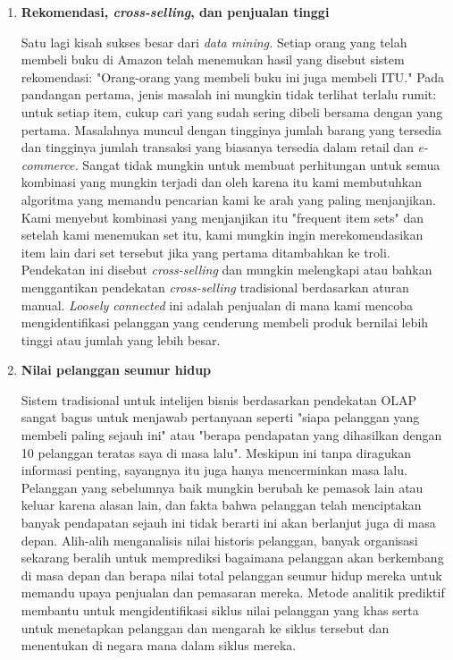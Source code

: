 \begin{enumerate}
    
  
 
  
  \item \textbf{Rekomendasi, \textit{cross-selling}, dan penjualan tinggi}
    \par Satu lagi kisah sukses besar dari \textit{data mining.} Setiap orang yang telah membeli buku di Amazon telah menemukan hasil yang disebut sistem rekomendasi: "Orang-orang yang membeli buku ini juga membeli ITU." Pada pandangan pertama, jenis masalah ini mungkin tidak terlihat terlalu rumit: untuk setiap item, cukup cari yang sudah sering dibeli bersama dengan yang pertama. Masalahnya muncul dengan tingginya jumlah barang yang tersedia dan tingginya jumlah transaksi yang biasanya tersedia dalam retail dan \textit{e-commerce. }Sangat tidak mungkin untuk membuat perhitungan untuk semua kombinasi yang mungkin terjadi dan oleh karena itu kami membutuhkan algoritma yang memandu pencarian kami ke arah yang paling menjanjikan. Kami menyebut kombinasi yang menjanjikan itu "frequent item sets" dan setelah kami menemukan set itu, kami mungkin ingin merekomendasikan item lain dari set tersebut jika yang pertama ditambahkan ke troli. Pendekatan ini disebut\textit{ cross-selling} dan mungkin melengkapi atau bahkan menggantikan pendekatan\textit{ cross-selling} tradisional berdasarkan aturan manual. \textit{Loosely connected }ini adalah penjualan di mana kami mencoba mengidentifikasi pelanggan yang cenderung membeli produk bernilai lebih tinggi atau jumlah yang lebih besar.
    
    \item	\textbf{Nilai pelanggan seumur hidup }
    \par Sistem tradisional untuk intelijen bisnis berdasarkan pendekatan OLAP sangat bagus untuk menjawab pertanyaan seperti "siapa pelanggan yang membeli paling sejauh ini" atau "berapa pendapatan yang dihasilkan dengan 10 pelanggan teratas saya di masa lalu". Meskipun ini tanpa diragukan informasi penting, sayangnya itu juga hanya mencerminkan masa lalu. Pelanggan yang sebelumnya baik mungkin berubah ke pemasok lain atau keluar karena alasan lain, dan fakta bahwa pelanggan telah menciptakan banyak pendapatan sejauh ini tidak berarti ini akan berlanjut juga di masa depan. Alih-alih menganalisis nilai historis pelanggan, banyak organisasi sekarang beralih untuk memprediksi bagaimana pelanggan akan berkembang di masa depan dan berapa nilai total pelanggan seumur hidup mereka untuk memandu upaya penjualan dan pemasaran mereka. Metode analitik prediktif membantu untuk mengidentifikasi siklus nilai pelanggan yang khas serta untuk menetapkan pelanggan dan mengarah ke siklus tersebut dan menentukan di negara mana dalam siklus mereka.
\end{enumerate}

